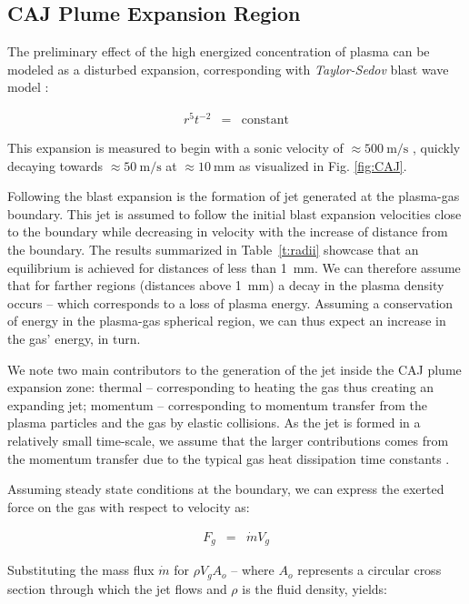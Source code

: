 \documentclass[a4paper]{iacas}%
\begin{document}
\subsection{CAJ Plume Expansion Region}\label{subs:CAJ_expansion}

The preliminary effect of the high energized concentration of plasma can be modeled \cite{KR} as a disturbed expansion, corresponding with \emph{Taylor-Sedov} blast wave model \cite{TAYLOR,SEDOV}: 

\begin{eqnarray}\label{eqn:taylor_sedov}
r^5 t^{-2} &=& \mathrm{constant}
\end{eqnarray}

This expansion is measured to begin with a sonic velocity of $\approx 500~\mathrm{m/s}$ \cite{KRClose}, quickly decaying towards $\approx 50~\mathrm{m/s}$ \cite{KR,KRFar} at $\approx 10~\mathrm{mm}$ as visualized in Fig. \ref{fig:CAJ}.

Following the blast expansion is the formation of jet generated at the plasma-gas boundary. This jet is assumed to follow the initial blast expansion velocities close to the boundary while decreasing in velocity with the increase of distance from the boundary. The results summarized in Table~\ref{t:radii} showcase that an equilibrium is achieved for distances of less than 1~mm. We can therefore assume that for farther regions (distances above 1~mm) a decay in the plasma density occurs -- which corresponds to a loss of plasma energy. Assuming a conservation of energy in the plasma-gas spherical region, we can thus expect an increase in the gas' energy, in turn.

We note two main contributors to the generation of the jet inside the CAJ plume expansion zone: thermal -- corresponding to heating the gas thus creating an expanding jet; momentum -- corresponding to momentum transfer from the plasma particles and the gas by elastic collisions. As the jet is formed in a relatively small time-scale, we assume that the larger contributions comes from the momentum transfer due to the typical gas heat dissipation time constants \cite{KRClose}.

Assuming steady state conditions at the boundary, we can express the exerted force on the gas with respect to velocity as:

\begin{eqnarray}\label{eqn:force_mass_flux}
	F_g &=& \dot{m} V_g
\end{eqnarray}

Substituting the mass flux $\dot{m}$ for $\rho V_g A_{o}$ -- where $A_{o}$ represents a circular cross section through which the jet flows and $\rho$ is the fluid density, yields:
\end{document}
